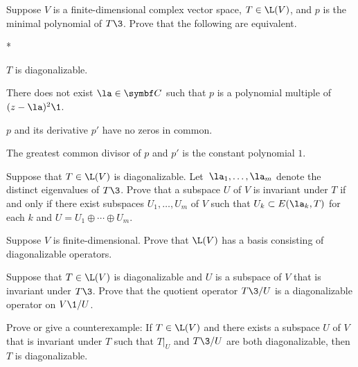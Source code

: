 \begin{exercises}
\exercise
Suppose $V$ is a finite-dimensional complex vector space, $T \in \L(V)$, and $p$ is the minimal polynomial of $T\3$. Prove that the following are equivalent.\label{2gcd}
\begin{subtheorem}*
\item
$T$ is diagonalizable.
\item
There does not exist $\la \in \C{}$ such that $p$ is a polynomial multiple of $(z-\la)^2\1$.
\item
$p$ and its derivative $p'$ have no zeros in common.
\item
The greatest common divisor of $p$ and $p'$ is the constant polynomial $1$.
\end{subtheorem}


\exercise
Suppose that $T \in \L(V)$ is diagonalizable. Let~$\la_1, \ldots, \la_m$ denote the distinct eigenvalues of $T\3$. Prove that a subspace $U$ of $V$ is invariant under $T$ if and only if there exist subspaces $U_1, \ldots, U_m$ of $V$ such that
$U_k \subset E(\la_k, T)$ for each $k$ and
$
U = U_1 \oplus \cdots \oplus U_m$.


\exercise
Suppose $V$ is finite-dimensional. Prove that $\L(V)$ has a basis consisting of diagonalizable operators.\label{5basisdiag}


\exercise
Suppose that $T \in \L(V)$ is diagonalizable and $U$ is a subspace of $V$ that is invariant under $T\3$. Prove that the quotient operator $T\3/U$ is a diagonalizable operator on $V\1/U$.


\exercise
Prove or give a counterexample: If $T \in \L(V)$ and there exists a subspace $U$ of $V$ that is invariant under $T$ such that $T|_U$ and $T\3/U$ are both diagonalizable, then $T$ is diagonalizable.



\end{exercises}
